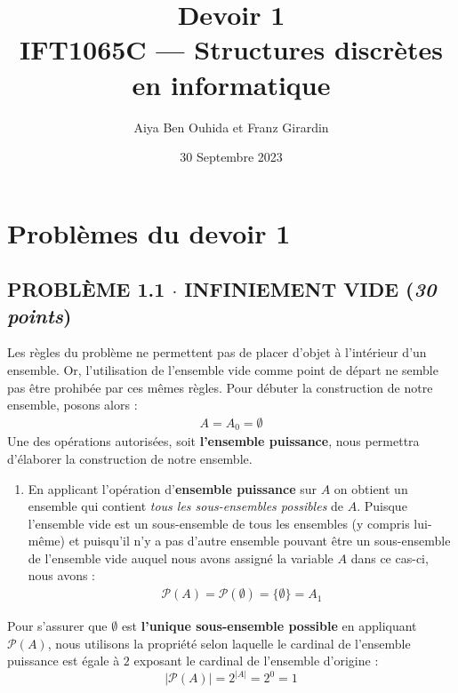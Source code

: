 \documentclass[8pt]{report}
\title{\Huge{Devoir 1}\\{IFT1065C — Structures discrètes en informatique}}
\author{\huge{Aiya Ben Ouhida et Franz Girardin}}
\date{30 Septembre 2023}
\begin{document}
\maketitle
\pagebreak
\tableofcontents
\pagebreak
\chapter{Problèmes du devoir 1}
\section*{\textnormal{PROBLÈME 1.1 \;\;\;\; $\cdot$ \;\;\;\; INFINIEMENT VIDE \hspace*{\fill} (\textit{30 points})}}


\noindent Les règles du problème ne permettent pas de placer d'objet à l'intérieur d'un ensemble. 
Or, l'utilisation de l'ensemble vide comme point de départ ne semble pas être prohibée par ces mêmes règles.
    Pour débuter la construction de notre ensemble, posons alors : 
    \begin{align}
        A = A_0 = \emptyset \label{eq:AEmptySetEq}
    \end{align}
    Une des opérations autorisées, soit \textbf{l'ensemble puissance}, nous permettra 
    d'élaborer la construction de notre ensemble. 
    \begin{enumerate}
        \item En applicant l'opération d'\textbf{ensemble puissance} sur $A$ on obtient un ensemble qui contient 
            \textit{tous les sous-ensembles possibles} de $A$. Puisque l'ensemble vide est un sous-ensemble de 
            tous les ensembles (y compris lui-même) et puisqu'il n'y a pas d'autre ensemble 
            pouvant être un sous-ensemble de l'ensemble vide auquel nous avons assigné la variable $A$ dans 
            ce cas-ci, nous avons : 
            \begin{align}
                \label{eq:A_1}
                \mathcal{P}(A) = \mathcal{P}(\emptyset) = \{ \emptyset \} = A_1       
            \end{align}
    \end{enumerate}
    \begin{note}{}{}
        Pour s'assurer que $\emptyset$ est \textbf{l'unique sous-ensemble possible} en appliquant $\mathcal{P}(A)$,
        nous utilisons la propriété selon laquelle le cardinal de l'ensemble puissance est égale
        à $2$ exposant le cardinal de l'ensemble d'origine : 
        \[ |\mathcal{P}(A)| = 2^{|A|} = 2^0 = 1 \]
    \end{note}
\end{document}
